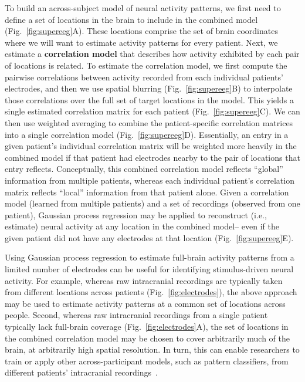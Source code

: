 \documentclass[runningheads]{llncs}
\begin{document}
To build an across-subject model of neural activity patterns, we first
need to define a set of locations in the brain to include in the
combined model (Fig.~\ref{fig:supereeg}A).  These locations comprise
the set of brain coordinates where we will want to estimate activity
patterns for every patient.  Next, we estimate a \textbf{correlation
  model} that describes how activity exhibited by each pair of
locations is related.  To estimate the correlation model, we first
compute the pairwise correlations between activity recorded from each
individual patients' electrodes, and then we use spatial blurring
(Fig.~\ref{fig:supereeg}B) to interpolate those correlations over the
full set of target locations in the model.  This yields a single
estimated correlation matrix for each patient
(Fig.~\ref{fig:supereeg}C).  We can then use weighted averaging to
combine the patient-specific correlation matrices into a single
correlation model (Fig.~\ref{fig:supereeg}D).  Essentially, an entry
in a given patient's individual correlation matrix will be weighted
more heavily in the combined model if that patient had electrodes
nearby to the pair of locations that entry reflects.  Conceptually,
this combined correlation model reflects ``global'' information from
multiple patients, whereas each individual patient's correlation
matrix reflects ``local'' information from that patient alone.  Given
a correlation model (learned from multiple patients) and a set of
recordings (observed from one patient), Gaussian process regression
may be applied to reconstruct (i.e., estimate) neural activity at any
location in the combined model-- even if the given patient did not
have any electrodes at that location (Fig.~\ref{fig:supereeg}E).

Using Gaussian process regression to estimate full-brain activity
patterns from a limited number of electrodes can be useful for
identifying stimulus-driven neural activity.  For example, whereas raw
intracranial recordings are typically taken from different locations
across patients (Fig.~\ref{fig:electrodes}), the above approach may be
used to estimate activity patterns at a common set of locations across
people.  Second, whereas raw intracranial recordings from a single
patient typically lack full-brain coverage
(Fig.~\ref{fig:electrodes}A), the set of locations in the combined
correlation model may be chosen to cover arbitrarily much of the
brain, at arbitrarily high spatial resolution.  In turn, this can
enable researchers to train or apply other across-participant models,
such as pattern classifiers, from different patients' intracranial
recordings~\citep{ScanEtal21}.
\end{document}
